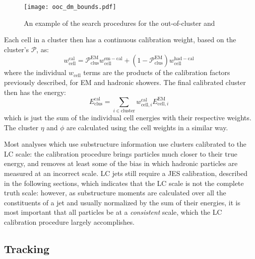 
\begin{figure}
\centering
\texttt{[image: ooc\_dm\_bounds.pdf]}
\label{fig:jet-reconstruction:cluster-calibration:ooc-dm}
\caption{An example of the search procedures for the out-of-cluster and }
\end{figure}



Each cell in a cluster then has a continuous calibration weight, based on the cluster's $\mathcal{P}$, as:
%
\begin{equation}
w_\mathrm{cell}^\mathrm{cal} = \mathcal{P}^\mathrm{EM}_\mathrm{clus} w_\mathrm{cell}^\mathrm{em-cal} + (1 - \mathcal{P}_\mathrm{clus}^\mathrm{EM}) w_\mathrm{cell}^\mathrm{had-cal}
\end{equation}
%
where the individual $w_\mathrm{cell}$ terms are the products of the calibration factors previously described, for EM and hadronic showers. The final calibrated cluster then has the energy:
%
\begin{equation}
E^\mathrm{cal}_\mathrm{clus} = \sum_{i \in \mathrm{cluster}} w_{\mathrm{cell},i}^\mathrm{cal} E_{\mathrm{cell},i}^\mathrm{EM}
\end{equation}
%
which is just the sum of the individual cell energies with their respective weights. The cluster $\eta$ and $\phi$ are calculated using the cell weights in a similar way.

Most analyses which use substructure information use clusters calibrated to the LC scale: the calibration procedure brings particles much closer to their true energy, and removes at least some of the bias in which hadronic particles are measured at an incorrect scale. LC jets still require a JES calibration, described in the following sections, which indicates that the LC scale is not the complete truth scale: however, as substructure moments are calculated over all the constituents of a jet and usually normalized by the sum of their energies, it is most important that all particles be at a \textit{consistent} scale, which the LC calibration procedure largely accomplishes.

\subsection{Tracking}


